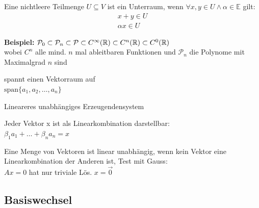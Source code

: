 \documentclass[a4paper,twocolumn]{article}
\begin{document}
	\begin{fdef}[Unterraum]
		Eine nichtleere Teilmenge $U \subseteq V$ ist ein Unterraum, wenn $\forall x,y \in U \land \alpha \in \mathbb{E}$ gilt:
		\begin{align*}
			x+y \in U \\
			\alpha x \in U
		\end{align*}

	\end{fdef}
	\textbf{Beispiel:} $\mathcal{P}_0 \subset \mathcal{P}_n \subset \mathcal{P} \subset C^{\infty}(\mathbb{R})
						\subset C^n(\mathbb{R}) \subset C^0(\mathbb{R})$\\
	wobei $C^n$ alle mind. $n$ mal ableitbaren Funktionen und $\mathcal{P}_n$ die Polynome mit Maximalgrad $n$ sind
	
	\begin{fdef}[Erzeugendensystem]
		spannt einen Vektorraum auf\\
		$\text{span} \{a_1, a_2, \ldots, a_n \}$
	\end{fdef}

	\begin{fdef}[Basis]
		Lineareres unabhängiges Erzeugendensystem
	\end{fdef}
	
	\begin{fdef}[Linearkombination]
		Jeder Vektor x ist als Linearkombination darstellbar:\\
		$\beta_1 a_1 + \ldots + \beta_n a_n = x$
	\end{fdef}
	
	\begin{feig}
		Eine Menge von Vektoren ist linear unabhängig, wenn kein Vektor eine Linearkombination der Anderen ist, Test mit Gauss:\\
		$Ax = 0$ hat nur triviale Lös. $x=\overrightarrow{0}$
	\end{feig}

	
	\subsection{Basiswechsel}
	
\end{document}
